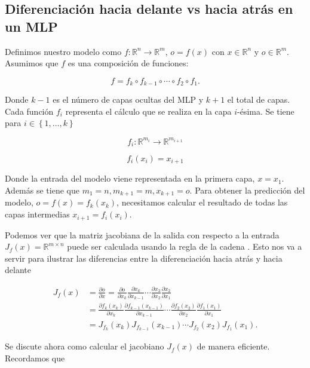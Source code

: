 \subsection{Diferenciación hacia delante vs hacia atrás en un MLP}


Definimos nuestro modelo como $f: \mathbb{R}^n \rightarrow \mathbb{R}^m$, $o=f(x)$ con $x \in \mathbb{R}^n$  y $o \in \mathbb{R}^m$. Asumimos que $f$ es una composición de funciones:

$$f=f_k \circ f_{k-1} \circ \cdots \circ f_2 \circ f_1.$$

Donde $k-1$ es el número de capas ocultas del MLP y $k+1$ el total de capas. Cada función $f_i$ representa el cálculo que se realiza en la capa $i$-ésima. Se tiene para $i \in \left \{ 1,\ldots,k \right \}$


$$f_i: \mathbb{R}^{m_i} \rightarrow \mathbb{R}^{m_{i+1}}$$

$$f_i(x_i)=x_{i+1}$$

Donde la entrada del modelo viene representada en la primera capa, $x=x_1$. Además se tiene que $m_1=n, m_{k+1}=m, x_{k+1}=o$. Para obtener la predicción del modelo, $o=f(x)=f_k(x_k)$, necesitamos calcular el resultado de todas las capas intermedias $x_{i+1}=f_i(x_i)$. 

Podemos ver que la matriz jacobiana de la salida con respecto a la entrada $J_f(x) =  \mathbb{R}^{m\times n}$ puede ser calculada usando la regla de la cadena . Esto nos va a servir para ilustrar las diferencias entre la diferenciación hacia atrás y hacia delante


\begin{align*}
	J_f(x) &= \frac{\partial o}{\partial x} = \frac{\partial o}{\partial x_k} \frac{\partial x_k}{\partial x_{k-1}} \cdots \frac{\partial x_3}{\partial x_2} \frac{\partial x_2}{\partial x_1} \\	
	&=\frac{\partial f_k(x_k)}{\partial x_k} \frac{\partial f_{k-1}(x_{k-1})}{\partial x_{k-1}} \cdots \frac{\partial f_2(x_2)}{\partial x_2} \frac{\partial f_1(x_1)}{\partial x_1} \\	
	&= J_{f_k}(x_k) J_{f_{k-1}}(x_{k-1}) \cdots J_{f_2}(x_2) J_{f_1}(x_1).
\end{align*}

Se discute ahora como calcular el jacobiano $J_f(x)$ de manera eficiente. Recordamos que 

